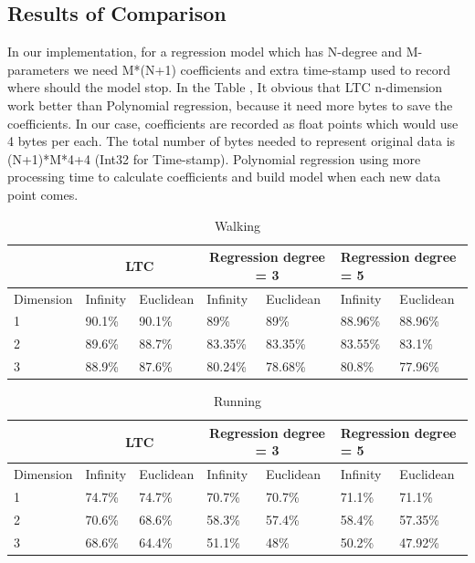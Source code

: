 \subsection{Results of Comparison}
In our implementation, for a regression model which has N-degree and
M-parameters we need M*(N+1) coefficients and extra time-stamp used to record
where should the model stop. In the Table , It obvious that LTC n-dimension work
better than Polynomial regression, because it need more bytes to save the
coefficients. In our case, coefficients are recorded as float points which would
use 4 bytes per each. The total number of bytes needed to represent original
data is (N+1)*M*4+4 (Int32 for Time-stamp). Polynomial regression using more
processing time to calculate coefficients and build model when each new data
point comes.
\begin{table}[]
\begin{tabular}{|l|l|l|l|l|l|l|l|}
\hline
           & \multicolumn{2}{c|}{LTC} & \multicolumn{2}{c|}{Regression degree = 3} & \multicolumn{3}{l|}{Regression degree = 5}\\ \hline
Dimension & Infinity   & Euclidean   & Infinity    & Euclidean     & Infinity      & \multicolumn{2}{l|}{Euclidean} \\ \hline
1          & 90.1\%     & 90.1\%      & 89\%        & 89\%          & 88.96\%       & \multicolumn{2}{l|}{88.96\%}   \\ \hline
2          & 89.6\%     & 88.7\%      & 83.35\%     & 83.35\%       & 83.55\%       & \multicolumn{2}{l|}{83.1\%}    \\ \hline
3          & 88.9\%     & 87.6\%      & 80.24\%     & 78.68\%       & 80.8\%        & \multicolumn{2}{l|}{77.96\%}   \\ \hline
\end{tabular}
\caption{Walking  }
\end{table}


\begin{table}[]
\begin{tabular}{|l|l|l|l|l|l|l|l|}
\hline
           & \multicolumn{2}{c|}{LTC} & \multicolumn{2}{c|}{Regression degree = 3} & \multicolumn{3}{l|}{Regression degree = 5}          \\ \hline
Dimension & Infinity   & Euclidean   & Infinity            & Euclidean           & Infinity& \multicolumn{2}{l|}{Euclidean} \\ \hline
1          & 74.7\%     & 74.7\%      & 70.7\%      & 70.7\%        & 71.1\%        & \multicolumn{2}{l|}{71.1\%}    \\ \hline
2          & 70.6\%     & 68.6\%      & 58.3\%      & 57.4\%        & 58.4\%        & \multicolumn{2}{l|}{57.35\%}   \\ \hline
3          & 68.6\%     & 64.4\%      & 51.1\%      & 48\%          & 50.2\%        & \multicolumn{2}{l|}{47.92\%}   \\ \hline
\end{tabular}
\caption{Running}
\end{table}
